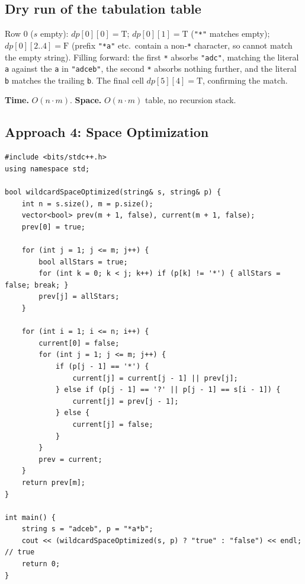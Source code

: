 \subsection*{Dry run of the tabulation table}


Row $0$ ($s$ empty): $\textit{dp}[0][0]=\text{T}$;
$\textit{dp}[0][1]=\text{T}$ (\texttt{"*"} matches empty);
$\textit{dp}[0][2..4]=\text{F}$ (prefix \texttt{"*a"} etc.\ contain a
non-\texttt{*} character, so cannot match the empty string). Filling
forward: the first \texttt{*} absorbs \texttt{"adc"}, matching the
literal \texttt{a} against the \texttt{a} in \texttt{"adceb"}, the
second \texttt{*} absorbs nothing further, and the literal \texttt{b}
matches the trailing \texttt{b}. The final cell
$\textit{dp}[5][4]=\text{T}$, confirming the match.

\begin{complexitybox}
\textbf{Time.} $O(n \cdot m)$.
\textbf{Space.} $O(n \cdot m)$ table, no recursion stack.
\end{complexitybox}

\subsection*{Approach 4: Space Optimization}

\begin{lstlisting}
#include <bits/stdc++.h>
using namespace std;

bool wildcardSpaceOptimized(string& s, string& p) {
    int n = s.size(), m = p.size();
    vector<bool> prev(m + 1, false), current(m + 1, false);
    prev[0] = true;

    for (int j = 1; j <= m; j++) {
        bool allStars = true;
        for (int k = 0; k < j; k++) if (p[k] != '*') { allStars = false; break; }
        prev[j] = allStars;
    }

    for (int i = 1; i <= n; i++) {
        current[0] = false;
        for (int j = 1; j <= m; j++) {
            if (p[j - 1] == '*') {
                current[j] = current[j - 1] || prev[j];
            } else if (p[j - 1] == '?' || p[j - 1] == s[i - 1]) {
                current[j] = prev[j - 1];
            } else {
                current[j] = false;
            }
        }
        prev = current;
    }
    return prev[m];
}

int main() {
    string s = "adceb", p = "*a*b";
    cout << (wildcardSpaceOptimized(s, p) ? "true" : "false") << endl; // true
    return 0;
}
\end{lstlisting}


